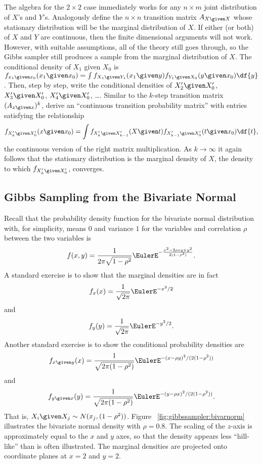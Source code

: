 \documentclass[12pt]{article}
\begin{document}
The algebra for the \( 2 \times 2 \) case immediately works for any \( n
\times m \) joint distribution of \( X \)'s and \( Y \)'s.  Analogously
define the \( n \times n \) transition matrix \( A_{X \given X} \) whose
stationary distribution will be the marginal distribution of \( X \). If
either (or both) of \( X \) and \( Y \) are continuous, then the finite
dimensional arguments will not work.  However, with suitable
assumptions, all of the theory still goes through, so the Gibbs sampler
still produces a sample from the marginal distribution of \( X \).  The
conditional density of \( X_1 \) given \( X_0 \) is \( f_{x_1 \given x_0}
(x_1 \given x_0) = \int f_{X_1 \given Y_1}(x_1 \given y)f_{Y_1 \given X_0}
(y \given x_0) \df{y} \).  Then, step by step, write the conditional
densities of \( X'_2 \given X'_0 \), \( X'_3 \given X'_0 \), \( X'_4
\given X'_0 \), \dots.  Similar to the \( k \)-step transition matrix \(
(A_{x \given x})^k \), derive an ``continuous transition probability
matrix'' with entries satisfying the relationship
\[
    f_{X'_k \given X'_0}(x \given x_0 ) = \int f_{X'_k \given X'_{k-1}}
    (X \given t) f_{X'_{k-1} \given X'_{0}}(t \given x_0) \df{t},
\] the continuous version of the right matrix multiplication.  As \( k
\to \infty \) it again follows that the stationary distribution is the
marginal density of \( X \), the density to which \( f_{X'_k \given X'_0}
\), converges.

\subsection*{Gibbs Sampling from the Bivariate Normal}

Recall that the probability density function for the bivariate normal
distribution%
with, for simplicity, means \( 0 \) and variance \( 1 \) for the
variables and correlation \( \rho \) between the two variables is
\[
    f(x, y) = \frac{1}{2\pi \sqrt{1 - \rho^2}} \EulerE^{- \frac{x^2 - 2
    \rho x y + y^2}{2(1-\rho^2)}}.
\] A standard exercise is to show that the marginal densities%
are in fact
\[
    f_{x}(x) = \frac{1}{\sqrt{2\pi}} \EulerE^{-x^2/2}
\] and
\[
    f_{y}(y) = \frac{1}{\sqrt{2\pi}} \EulerE^{-y^2/2}.
\] Another standard exercise is to show the conditional probability
densities are
\[
    f_{x \given y}(x) = \frac{1}{\sqrt{2\pi (1-\rho^2)}}
    \EulerE^{-(x-\rho y)^2/
    (2(1-\rho^2))}
\] and
\[
    f_{y \given x}(y) = \frac{1}{\sqrt{2\pi (1-\rho^2)}}
    \EulerE^{-(y-\rho x)^2/
    (2(1-\rho^2))}.
\] That is, \( X_i \given X_j \sim N(x_j, (1-\rho^2)) \). Figure~%
\ref{fig:gibbssampler:bivarnorm} illustrates the bivariate normal
density with \( \rho = 0.8 \).  The scaling of the \( z \)-axis is
approximately equal to the \( x \) and \( y \) axes, so that the density
appears less ``hill-like'' than is often illustrated.  The marginal
densities are projected onto coordinate planes at \( x = 2 \) and \( y =
2 \).
\end{document}
